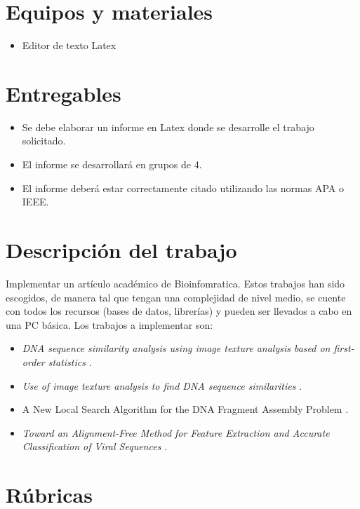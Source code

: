 \documentclass{article}
\begin{document}
\section{Equipos y materiales}
\begin{itemize}
	\item Editor de texto  Latex 
\end{itemize}

\section{Entregables}
\begin{itemize}
	\item Se debe elaborar un informe en Latex donde se desarrolle el trabajo solicitado.
	\item El informe se desarrollará en grupos de 4.
	\item El informe deberá estar correctamente citado utilizando las normas APA o IEEE.
\end{itemize}



\clearpage

\section{Descripción del trabajo}

Implementar un artículo académico de Bioinfomratica. Estos trabajos han sido escogidos, de manera tal que tengan una complejidad de nivel medio, se cuente con todos los recursos (bases de datos, librerías) y pueden ser llevados a cabo en una PC básica. Los trabajos a implementar son:

\begin{itemize}
	\item \textit{DNA sequence similarity analysis using image texture analysis based
	on first-order statistics} \cite{delibacs2020dna}.
	\item \textit{Use of image texture analysis to find DNA sequence similarities} \cite{chen2018use}.
	\item A New Local Search Algorithm for the DNA
	Fragment Assembly Problem \cite{alba2007new}.
	\item \textit{Toward an Alignment-Free Method for Feature Extraction
	and Accurate Classification of Viral Sequences} \cite{lebatteux2019toward}.
\end{itemize}


\section{Rúbricas}
\end{document}
